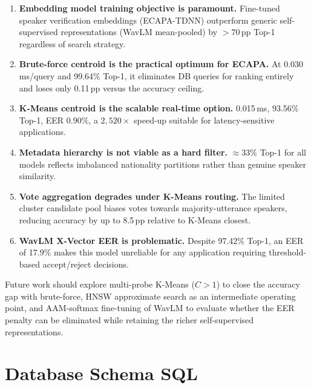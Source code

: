 \documentclass[12pt, a4paper]{article}
\begin{document}
\begin{enumerate}
  \item \textbf{Embedding model training objective is paramount.}
        Fine-tuned speaker verification embeddings (ECAPA-TDNN)
        outperform generic self-supervised representations (WavLM
        mean-pooled) by $>70$\,pp Top-1 regardless of search strategy.
  \item \textbf{Brute-force centroid is the practical optimum for ECAPA.}
        At 0.030\,ms/query and 99.64\% Top-1, it eliminates DB
        queries for ranking entirely and loses only 0.11\,pp versus
        the accuracy ceiling.
  \item \textbf{K-Means centroid is the scalable real-time option.}
        0.015\,ms, 93.56\% Top-1, EER 0.90\%, a $2{,}520{\times}$
        speed-up suitable for latency-sensitive applications.
  \item \textbf{Metadata hierarchy is not viable as a hard filter.}
        ${\approx}33\%$ Top-1 for all models reflects imbalanced
        nationality partitions rather than genuine speaker similarity.
  \item \textbf{Vote aggregation degrades under K-Means routing.}
        The limited cluster candidate pool biases votes towards
        majority-utterance speakers, reducing accuracy by up to
        8.5\,pp relative to K-Means closest.
  \item \textbf{WavLM X-Vector EER is problematic.}
        Despite 97.42\% Top-1, an EER of 17.9\% makes this model
        unreliable for any application requiring threshold-based
        accept/reject decisions.
\end{enumerate}

Future work should explore multi-probe K-Means ($C{>}1$) to close the
accuracy gap with brute-force, HNSW approximate search as an
intermediate operating point, and AAM-softmax fine-tuning of WavLM
to evaluate whether the EER penalty can be eliminated while retaining
the richer self-supervised representations.

\clearpage
\appendix
\section{Database Schema SQL}
\label{app:schema}
\end{document}
